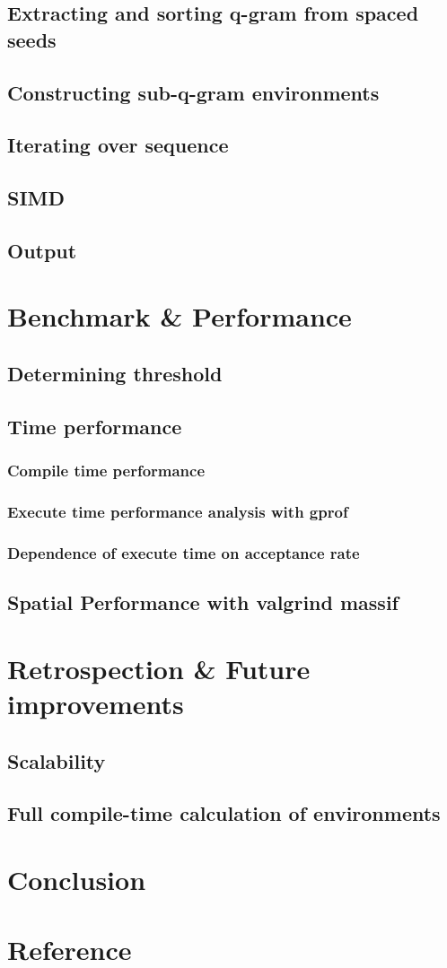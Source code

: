 \documentclass[11pt,a4paper]{scrartcl}
\begin{document}
\subsection{Extracting and sorting q-gram from spaced seeds}

\subsection{Constructing sub-q-gram environments}

\subsection{Iterating over sequence}

\subsection{SIMD}

\subsection{Output}

\section{Benchmark \& Performance}
\subsection{Determining threshold}
\subsection{Time performance}
\subsubsection{Compile time performance}
\subsubsection{Execute time performance analysis with gprof}
\subsubsection{Dependence of execute time on acceptance rate}
\subsection{Spatial Performance with valgrind massif}
\section{Retrospection \& Future improvements}
\subsection{Scalability}
\subsection{Full compile-time calculation of environments}
\section{Conclusion}
\section{Reference}
\end{document}
